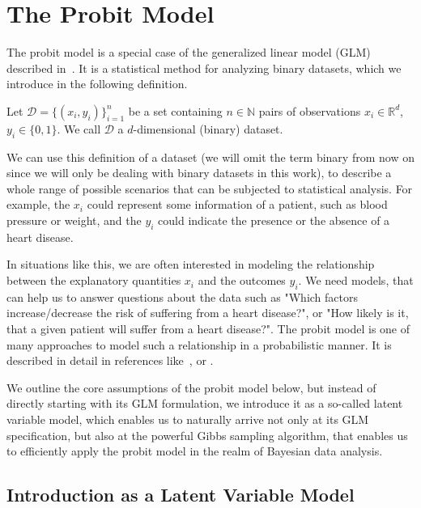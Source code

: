 \section{The Probit Model}

The probit model is a special case of the generalized linear model (GLM)
described in~\cite{glm-nelder}.
It is a statistical method for analyzing binary datasets,
which we introduce in the following definition.

\begin{definition}[Dataset]
    Let $\mathcal{D} = \{(x_i, y_i)\}_{i=1}^n$ be a set containing
    $n \in \mathbb{N}$ pairs of observations $x_i \in \mathbb{R}^d$,
    $y_i \in \{0, 1\}$.
    We call $\mathcal{D}$ a $d$-dimensional (binary) dataset.
\end{definition}

\noindent We can use this definition of a dataset
(we will omit the term binary from now on since we will only be dealing
with binary datasets in this work), to describe a whole range of possible scenarios
that can be subjected to statistical analysis.
For example, the $x_i$ could represent some information of a patient, such as
blood pressure or weight, and the $y_i$ could indicate the presence or
the absence of a heart disease.

In situations like this, we are often interested in modeling the
relationship between the explanatory quantities $x_i$ and the
outcomes $y_i$.
We need models, that can help us to answer questions about the data
such as "Which factors increase/decrease the risk of suffering from a heart disease?",
or "How likely is it, that a given patient will suffer from a heart disease?".
The probit model is one of many approaches to model such a
relationship in a probabilistic manner.
It is described in detail in references like~\cite{glm-nelder},
\cite{glm-agresti} or \cite{regression-fahrmeir}.

We outline the core assumptions of the probit model below,
but instead of directly starting with its GLM formulation, we introduce
it as a so-called latent variable model, which enables us to
naturally arrive not only at its GLM specification, but also
at the powerful Gibbs sampling algorithm, that enables
us to efficiently apply
the probit model in the realm of Bayesian data analysis.

\subsection{Introduction as a Latent Variable Model}
\label{sec:probit-introduction}

